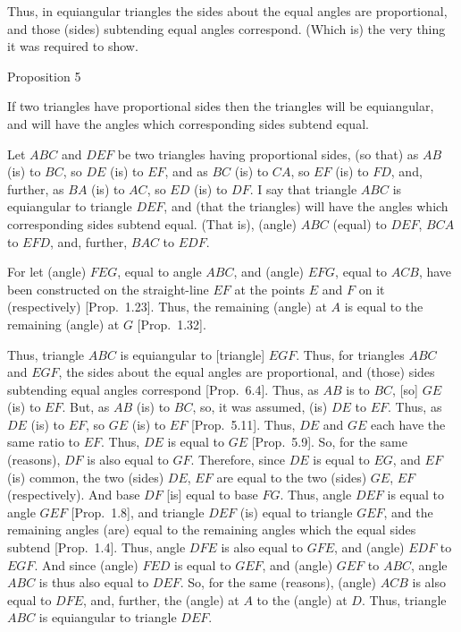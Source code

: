 Thus, in  equiangular triangles the sides about the
equal angles are proportional, and those (sides) subtending equal angles
 correspond. (Which is) the very thing it was required to show.


\begin{center}
{\large Proposition 5}
\end{center}

If two triangles have proportional sides then the
triangles will be equiangular, and will have the angles which  corresponding sides
subtend  equal.

\epsfysize=2.2in
\centerline{}

Let $ABC$ and $DEF$ be two triangles having proportional sides, (so that) as
$AB$ (is) to $BC$, so $DE$ (is) to $EF$, and as $BC$ (is) to $CA$, so $EF$ (is) to 
$FD$, and, further, as $BA$ (is) to $AC$, so $ED$ (is) to $DF$. I say that triangle
$ABC$ is equiangular to triangle $DEF$, and (that the triangles) will have the angles which corresponding sides subtend equal. (That is), (angle) $ABC$ (equal) to $DEF$, $BCA$ to
$EFD$, and, further, $BAC$ to $EDF$.

For let (angle) $FEG$, equal to angle $ABC$, and (angle) $EFG$, equal to
$ACB$, have been constructed on the straight-line $EF$ at the points
$E$ and $F$ on it (respectively)   [Prop.~1.23]. 
Thus, the remaining (angle) at $A$ is equal to the remaining (angle) at
$G$ [Prop.~1.32].

Thus, triangle $ABC$ is equiangular to [triangle] $EGF$. Thus, for triangles
$ABC$ and $EGF$, the sides about the equal angles are proportional, and
(those) sides subtending equal angles correspond [Prop.~6.4]. Thus, as $AB$ is to $BC$, [so]
$GE$ (is) to $EF$. But, as $AB$ (is) to $BC$, so, it was assumed, (is) $DE$  to
$EF$. Thus, as $DE$ (is) to $EF$, so $GE$ (is) to $EF$ [Prop.~5.11]. Thus, $DE$ and $GE$ each have the
same ratio to $EF$. Thus, $DE$ is equal to $GE$ [Prop.~5.9]. So, for the same (reasons), 
$DF$ is also equal to $GF$. Therefore, since $DE$ is equal to $EG$, and $EF$ (is)
common, the two (sides) $DE$, $EF$ are equal to the two (sides)
$GE$, $EF$ (respectively). And base $DF$ [is] equal to base $FG$. Thus, angle $DEF$
is equal to angle $GEF$  [Prop.~1.8],  and triangle $DEF$ (is) equal to triangle $GEF$,  and the remaining angles (are) equal to the remaining
angles which the equal sides subtend  [Prop.~1.4]. Thus,
angle $DFE$ is also equal to $GFE$, and (angle) $EDF$ to $EGF$. And since 
(angle) $FED$ is equal to $GEF$, and (angle) $GEF$ to $ABC$, angle $ABC$ is
thus also equal to $DEF$. So, for the same (reasons), (angle) $ACB$ is
also equal to $DFE$, and, further, the (angle) at $A$ to the (angle) at $D$.
Thus, triangle $ABC$ is equiangular to triangle $DEF$.

